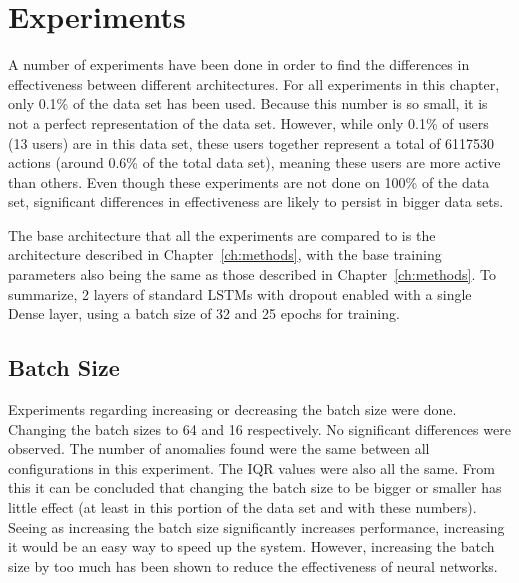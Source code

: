 \chapter{Experiments}\label{ch:experiments}

A number of experiments have been done in order to find the differences in effectiveness between different architectures. For all experiments in this chapter, only 0.1\% of the data set has been used. Because this number is so small, it is not a perfect representation of the data set. However, while only 0.1\% of users (13 users) are in this data set, these users together represent a total of 6117530 actions (around 0.6\% of the total data set), meaning these users are more active than others. Even though these experiments are not done on 100\% of the data set, significant differences in effectiveness are likely to persist in bigger data sets.

The base architecture that all the experiments are compared to is the architecture described in Chapter~\ref{ch:methods}, with the base training parameters also being the same as those described in Chapter~\ref{ch:methods}. To summarize, 2 layers of standard LSTMs with dropout enabled with a single Dense layer, using a batch size of 32 and 25 epochs for training.

\section{Batch Size}
Experiments regarding increasing or decreasing the batch size were done. Changing the batch sizes to 64 and 16 respectively. No significant differences were observed. The number of anomalies found were the same between all configurations in this experiment. The IQR values were also all the same. From this it can be concluded that changing the batch size to be bigger or smaller has little effect (at least in this portion of the data set and with these numbers). Seeing as increasing the batch size significantly increases performance, increasing it would be an easy way to speed up the system. However, increasing the batch size by too much has been shown to reduce the effectiveness of neural networks.

